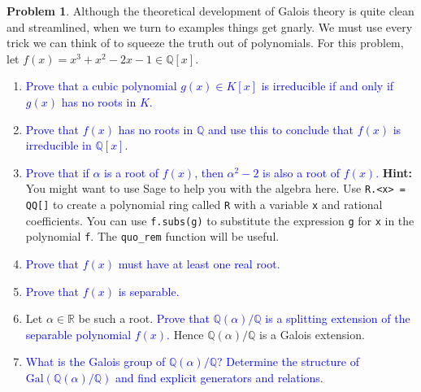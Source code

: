 \documentclass[11pt]{article}
\def\QQ{\mathbb{Q}}
\def\RR{\mathbb{R}}
\def\gal{\mathrm{Gal}}
\theoremstyle{definition}
\newtheorem{problem}{Problem}[section]
\numberwithin{equation}{subsection}
\newcommand{\blue}[1]{\textcolor{blue}{#1}}
\begin{document}
\begin{problem}
    Although the theoretical development of Galois theory is quite clean and streamlined, when we turn to examples things get gnarly.
    We must use every trick we can think of to squeeze the truth out of polynomials.
    For this problem, let $f(x) = x^3 + x^2 - 2x - 1 \in \QQ[x]$.

    \begin{enumerate}
        \item \blue{Prove that a cubic polynomial $g(x) \in K[x]$ is irreducible if and only if $g(x)$ has no roots in $K$.}
        
        \item \blue{Prove that $f(x)$ has no roots in $\QQ$ and use this to conclude that $f(x)$ is irreducible in $\QQ[x]$.}

        \item \blue{Prove that if $\alpha$ is a root of $f(x)$, then $\alpha^2 - 2$ is also a root of $f(x)$.}
        \textbf{Hint: }You might want to use Sage to help you with the algebra here.
        Use \texttt{R.<x> = QQ[]} to create a polynomial ring called \texttt{R} with a variable \texttt{x} and rational coefficients.
        You can use \texttt{f.subs(g)} to substitute the expression \texttt{g} for \texttt{x} in the polynomial \texttt{f}.
        The \texttt{quo\_rem} function will be useful.

        \item \blue{Prove that $f(x)$ must have at least one real root.}

        \item \blue{Prove that $f(x)$ is separable.}

        \item Let $\alpha \in \RR$ be such a root.
        \blue{Prove that $\QQ(\alpha)/\QQ$ is a splitting extension of the separable polynomial $f(x)$.}
        Hence $\QQ(\alpha)/\QQ$ is a Galois extension.

        \item \blue{What is the Galois group of $\QQ(\alpha)/\QQ$?
        Determine the structure of $\gal(\QQ(\alpha)/\QQ)$ and find explicit generators and relations.}
    \end{enumerate}
\end{problem}
\end{document}
